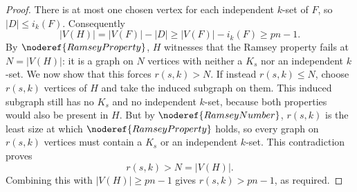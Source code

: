 \begin{proof}
There is at most one chosen vertex for each independent \(k\)-set of \(F\), so \(|D|\le i_k(F)\). Consequently
\[
  |V(H)|=|V(F)|-|D|\ge |V(F)|-i_k(F)\ge pn-1.
\]
By \(\noderef{RamseyProperty}\), \(H\) witnesses that the Ramsey property fails at \(N=|V(H)|\): it is a graph on \(N\) vertices with neither a \(K_s\) nor an independent \(k\)-set. We now show that this forces \(r(s,k)>N\). If instead \(r(s,k)\le N\), choose \(r(s,k)\) vertices of \(H\) and take the induced subgraph on them. This induced subgraph still has no \(K_s\) and no independent \(k\)-set, because both properties would also be present in \(H\). But by \(\noderef{RamseyNumber}\), \(r(s,k)\) is the least size at which \(\noderef{RamseyProperty}\) holds, so every graph on \(r(s,k)\) vertices must contain a \(K_s\) or an independent \(k\)-set. This contradiction proves
\[
  r(s,k)>N=|V(H)|.
\]
Combining this with \(|V(H)|\ge pn-1\) gives \(r(s,k)>pn-1\), as required.
\end{proof}
